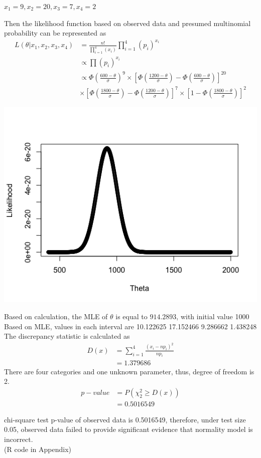 \documentclass[11pt,letterpaper]{article}
\begin{document}
\noindent $x_1 = 9, x_2=20, x_3=7, x_4=2$

\noindent Then the likelihood function based on observed data and presumed multinomial probability can be represented as 
\begin{align*}
L(\theta | x_1, x_2, x_3, x_4) &= \frac{n!}{\prod_{i=1}^{4} (x_i)} \prod_{i=1}^{4} (p_i)^{x_i}\\
&\propto \prod (p_i)^{x_i} \\
&\propto \Phi (\frac{600 - \theta}{\sigma})^9 \times [\Phi (\frac{1200 - \theta}{\sigma}) - \Phi (\frac{600 - \theta}{\sigma})]^{20} \\
& \times [\Phi (\frac{1800 - \theta}{\sigma}) - \Phi (\frac{1200 - \theta}{\sigma})]^{7} \times [1 - \Phi (\frac{1800 - \theta}{\sigma})]^{2}
\end{align*}

\includegraphics[scale=0.5]{q1-d}

\noindent Based on calculation, the MLE of $\theta$ is equal to $914.2893 $, with initial value 1000 \\

\noindent Based on MLE, values in each interval are 10.122625 17.152466  9.286662  1.438248\\

\noindent The discrepancy statistic is calculated as 
\begin{align*}
D(x) &= \sum_{i=1}^{4} \frac{(x_i - np_i)^2}{np_i} \\
&= 1.379686
\end{align*}
\noindent There are four categories and one unknown parameter, thus, degree of freedom is 2.
\begin{align*}
p-value &= P(\chi^2_2 \geq D(x)) \\
&= 0.5016549
\end{align*}

\noindent chi-square test p-value of observed data is 0.5016549, therefore, under test size 0.05, observed data failed to provide significant evidence that normality model is incorrect.\\

\noindent (R code in Appendix)
\end{document}
